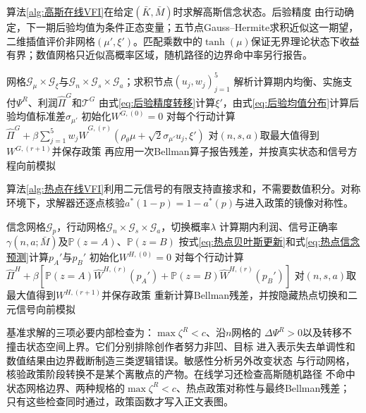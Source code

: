 \documentclass[UTF8, a4paper, 12pt, fontset=fandol]{ctexart}
\theoremstyle{definition}
\theoremstyle{remark}
\newcommand{\Prb}{\mathbb{P}}
\begin{document}
\begin{appendices}
算法\ref{alg:高斯在线VFI}在给定$(\bar K,\bar M)$时求解高斯信念状态。后验精度
由行动确定，下一期后验均值为条件正态变量；五节点Gauss--Hermite求积近似这一期望，
二维插值评价非网格$(\mu',\xi')$。匹配乘数中的$\tanh(\mu)$保证无界理论状态下收益
有界；数值网格只近似高概率区域，随机路径的边界命中率另行报告。

\begin{algorithm}[H]
  \caption{高斯漂移状态的信念空间值函数迭代}
  \label{alg:高斯在线VFI}
  \begin{algorithmic}[1]
    \Require 网格$\mathcal G_\mu\times\mathcal G_\xi$与$\mathcal G_n\times\mathcal G_s\times\mathcal G_a$；求积节点$(u_j,w_j)_{j=1}^5$
      \State 解析计算期内均衡、实施支付$\Psi^R$、利润$\widehat\Pi^G$和$\mathcal T^G$
      \State 由式\eqref{eq:后验精度转移}计算$\xi'$，由式\eqref{eq:后验均值分布}计算后验均值标准差$\sigma_{\mu'}$
    \EndFor
    \State 初始化$W^{G,(0)}=0$
    \Repeat
      \State 对每个行动计算$\widehat\Pi^G+\beta\sum_{j=1}^5w_j\widehat W^{G,(r)}(\rho_\theta\mu+\sqrt{2}\sigma_{\mu'}u_j,\xi')$
      \State 对$(n,s,a)$取最大值得到$W^{G,(r+1)}$并保存政策
    \State 再应用一次Bellman算子报告残差，并按真实状态和信号方程向前模拟
  \end{algorithmic}
\end{algorithm}

\clearpage
算法\ref{alg:热点在线VFI}利用二元信号的有限支持直接求和，不需要数值积分。对称
环境下，求解器还逐点核验$a^*(1-p)=1-a^*(p)$与进入政策的镜像对称性。

\begin{algorithm}[H]
  \caption{两题材马尔可夫热点的信念空间值函数迭代}
  \label{alg:热点在线VFI}
  \begin{algorithmic}[1]
    \Require 信念网格$\mathcal G_p$，行动网格$\mathcal G_n\times\mathcal G_s\times\mathcal G_a$，切换概率$\lambda$
      \State 计算期内利润、信号正确率$\gamma(n,a;\bar M)$及$\Prb(z=A)$、$\Prb(z=B)$
      \State 按式\eqref{eq:热点贝叶斯更新}和式\eqref{eq:热点信念预测}计算$p_A'$与$p_B'$
    \EndFor
    \State 初始化$W^{H,(0)}=0$
    \Repeat
      \State 对每个行动计算$\widehat\Pi^H+\beta[\Prb(z=A)\widehat W^{H,(r)}(p_A')+\Prb(z=B)\widehat W^{H,(r)}(p_B')]$
      \State 对$(n,s,a)$取最大值得到$W^{H,(r+1)}$并保存政策
    \State 重新计算Bellman残差，并按隐藏热点切换和二元信号向前模拟
  \end{algorithmic}
\end{algorithm}

基准求解的三项必要内部检查为：$\max\zeta^R<c$、沿$n$网格的
$\Delta\Psi^R>0$以及转移不撞击状态空间上界。它们分别排除创作者努力非凹、目标
进入表示失去单调性和数值结果由边界截断制造三类逻辑错误。敏感性分析另外改变状态
与行动网格，核验政策阶段转换不是某个离散点的产物。在线学习还检查高斯随机路径
不命中状态网格边界、两种规格的$\max\zeta^R<c$、热点政策对称性与最终Bellman残差；
只有这些检查同时通过，政策函数才写入正文表图。
\end{appendices}



\end{document}
